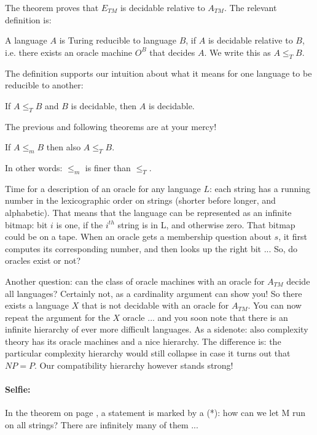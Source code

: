 The theorem proves that $E_{TM}$ is decidable relative to
$A_{TM}$. The relevant definition is:

\begin{definition}
A language $A$ is Turing reducible to language $B$, if $A$
is decidable relative to $B$, i.e. there exists an oracle machine
$O^B$ that decides $A$. We write this as $A \leq_T B$.
\end{definition}

The definition supports our intuition about what it means for one
language to be reducible to another:

\begin{theorem}
If $A \leq_T B$ and $B$ is decidable, then $A$ is decidable.
\end{theorem}

The previous and following theorems are at your mercy!

\begin{theorem}
If $A \leq_m B$ then also $A \leq_T B$.

In other words: $\leq_m$ is finer than $\leq_T$.
\end{theorem}

Time for a description of an oracle for any language $L$: each
string has a running number in the lexicographic order on strings
(shorter before longer, and alphabetic). That means that the language
can be represented as an infinite bitmap: bit $i$ is one, if the
$i^{th}$ string is in L, and otherwise zero. That bitmap could be on a
tape. When an oracle gets a membership question about $s$, it first
computes its corresponding number, and then looks up the right bit
... So, do oracles exist or not?

Another question: can the class of oracle machines with an oracle for
$A_{TM}$ decide all languages? Certainly not, as a cardinality
argument can show you! So there exists a language $X$ that is not
decidable with an oracle for $A_{TM}$. You can now repeat the argument
for the $X$ oracle ... and you soon note that there is an infinite
hierarchy of ever more difficult languages. As a sidenote: also
complexity theory has its oracle machines and a nice hierarchy. The
difference is: the particular complexity hierarchy would still
collapse in case it turns out that $NP = P$. Our compatibility
hierarchy however stands strong!

\paragraph{Selfie:} In the theorem on page \pageref{allestrings},
a statement is marked by a (*): how can we let M run on all strings?
There are infinitely many of them ...




